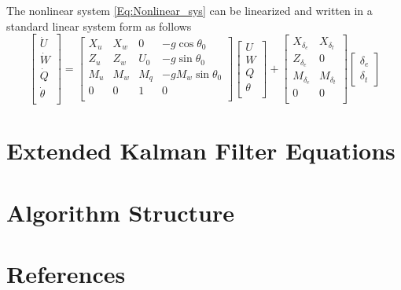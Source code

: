 \documentclass{article}
\begin{document}
The nonlinear system \ref{Eq:Nonlinear_sys} can be linearized and
written in a standard linear system form as follows \cite{Nelson, Stevens-Lewis}
\begin{equation} \label{Eq:Linearized_sys}
    \begin{bmatrix}
    \dot{U} \\
    \dot{W} \\
    \dot{Q} \\
    \dot{\theta} \\ 	
    \end{bmatrix}
    =
    \begin{bmatrix}
    X_u & X_w & 0 & -g \cos{\theta_0}\\
    Z_u & Z_w & U_0 & -g \sin{\theta_0}\\
    M_u & M_w & M_q & -g M_w \sin{\theta_0}\\
    0 & 0 & 1 & 0 \\
    \end{bmatrix}
    \begin{bmatrix}
    U \\
    W \\
    Q \\
    \theta \\ 	
    \end{bmatrix}
    +
    \begin{bmatrix}
    X_{\delta_e} & X_{\delta_t} \\
    Z_{\delta_e} & 0 \\
    M_{\delta_e} & M_{\delta_t} \\
    0 & 0\\ 	
    \end{bmatrix}
    \begin{bmatrix}
    {\delta_e} \\
    {\delta_t}  	
    \end{bmatrix}
    \end{equation}

\section{Extended Kalman Filter Equations}

\section{Algorithm Structure}

\section*{References}


\end{document}

